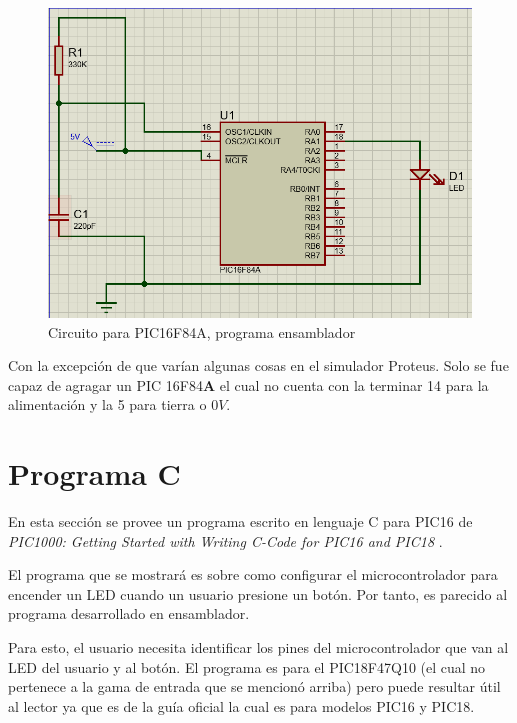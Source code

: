 \documentclass[conference]{IEEEtran}
\begin{document}
    \begin{figure}[H]
        \centering
        \includegraphics[width=0.3\paperwidth]{images/pic16f84a-assembly-sim}
        \caption{Circuito para PIC16F84A, programa ensamblador}
    \end{figure}

    \bigbreak

    Con la excepción de que varían algunas cosas en el simulador Proteus.
    Solo se fue capaz de agragar un PIC 16F84\textbf{A} el cual no cuenta con
    la terminar 14 para la alimentación y la 5 para tierra o $0V$.

    \section{Programa C}

    En esta sección se provee un programa escrito en lenguaje C para PIC16 de
    \textit{PIC1000: Getting Started with Writing C-Code for PIC16 and PIC18}
    \cite{microchip-c-program-2020}.

    \bigbreak

    El programa que se mostrará es sobre como configurar el microcontrolador
    para encender un LED cuando un usuario presione un botón. Por tanto, es
    parecido al programa desarrollado en ensamblador.

    \bigbreak

    Para esto, el usuario necesita identificar los pines del microcontrolador
    que van al LED del usuario y al botón. El programa es para el PIC18F47Q10
    (el cual no pertenece a la gama de entrada que se mencionó arriba) pero
    puede resultar útil al lector ya que es de la guía oficial la cual es
    para modelos PIC16 y PIC18.
\end{document}
